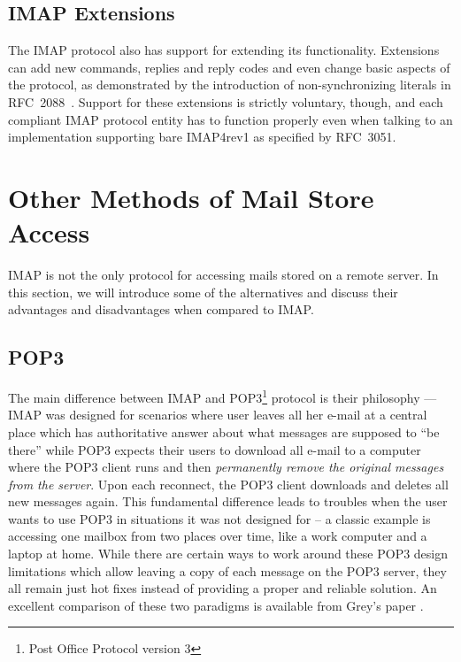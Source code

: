 \documentclass[12pt,notitlepage]{report}
\begin{document}
\subsection{IMAP Extensions}

The IMAP protocol also has support for extending its functionality.  Extensions
can add new commands, replies and reply codes and even change basic aspects of
the protocol, as demonstrated by the introduction of non-synchronizing literals
in RFC~2088~\cite{rfc-literalplus}. Support for these extensions is strictly
voluntary, though, and each compliant IMAP protocol entity has to function
properly even when talking to an implementation supporting bare IMAP4rev1 as
specified by RFC~3051.

\section{Other Methods of Mail Store Access}

IMAP is not the only protocol for accessing mails stored on a remote server.  In
this section, we will introduce some of the alternatives and discuss their
advantages and disadvantages when compared to IMAP.

\subsection{POP3}

The main difference between IMAP and POP3\footnote{Post Office Protocol version
3} protocol is their philosophy --- IMAP was designed for scenarios where user
leaves all her e-mail at a central place which has authoritative answer about
what messages are supposed to ``be there'' while POP3 expects their users to
download all e-mail to a computer where the POP3 client runs and then {\em
permanently remove the original messages from the server}.  Upon each reconnect,
the POP3 client downloads and deletes all new messages again.  This fundamental
difference leads to troubles when the user wants to use POP3 in situations it was not
designed for -- a classic example is accessing one mailbox from two places over
time, like a work computer and a laptop at home.  While there are certain ways
to work around these POP3 design limitations which allow leaving a copy of each
message on the POP3 server, they all remain just hot fixes
instead of providing a proper and reliable solution.  An excellent comparison of
these two paradigms is available from Grey's paper \cite{imap-vs-pop}.
\end{document}
